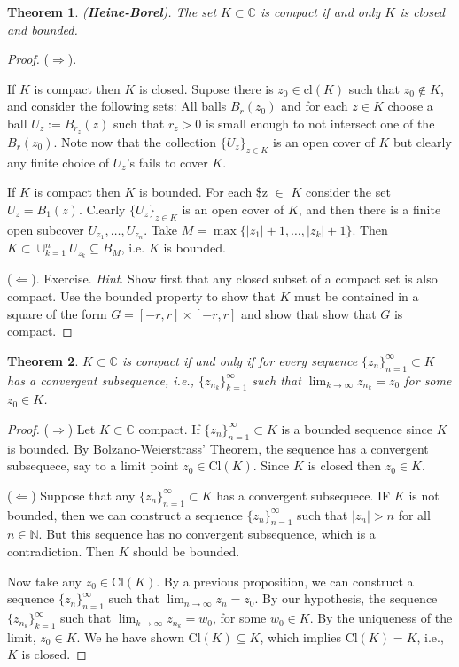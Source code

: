 \documentclass{amsart}
\newtheorem{thm}{Theorem}
\begin{document}
\begin{thm}
(\textbf{Heine-Borel}). The set \(K\subset \mathbb{C}\) is compact if and only \(K\) is closed and bounded.
\end{thm}
\begin{proof}


(\(\Rightarrow\)).

If \(K\) is compact then \(K\) is closed. Supose there is \(z_0\in \mbox{cl}(K)\) such that \(z_0\notin K\), and consider the following sets: All balls \(B_r(z_0)\) and for each \(z\in K\) choose a ball \(U_z:=B_{r_z}(z)\) such that \(r_z>0\) is small enough to not intersect one of the \(B_r(z_0)\). Note now that the collection \(\{U_z \}_{z\in K}\) is an open cover of \(K\) but clearly any finite choice of \(U_z\)'s fails to cover \(K\).

If \(K\) is compact then \(K\) is bounded. For each \$z \(\in\) \(K\) consider the set \(U_{z} = B_{1}(z)\). Clearly \(\{U_z \}_{z\in K}\) is an open cover of \(K\), and then there is a finite open subcover \(U_{z_1}, \ldots, U_{z_n}\). Take \(M = \max\{|z_1| + 1, \ldots, |z_k| +1 \}\). Then \(K \subset \cup_{k=1}^{n} U_{z_k} \subseteq B_M\), i.e. \(K\) is bounded.

(\(\Leftarrow\)). Exercise.
\emph{Hint}. Show first that any closed subset of a compact set is also compact. Use the bounded property to show that \(K\) must be contained in a square of the form \(G= [-r,r]\times [-r,r]\) and show that show that \(G\) is compact.
\end{proof}

\begin{thm}
\(K\subset \mathbb{C}\) is compact if and only if for every sequence \(\{z_n\}_{n=1}^{\infty}\subset K\) has a convergent subsequence, i.e., \(\{z_{n_k}\}_{k=1}^{\infty}\) such that \(\lim_{k\to\infty} z_{n_k} = z_0\) for some \(z_0\in K\).
\end{thm}
\begin{proof}
(\(\Rightarrow\)) Let \(K\subset\mathbb{C}\) compact. If \(\{z_n\}_{n=1}^{\infty}\subset K\) is a bounded sequence since \(K\) is bounded. By Bolzano-Weierstrass' Theorem, the sequence has a convergent subsequece, say to a limit point \(z_0\in \mbox{Cl}(K)\). Since \(K\) is closed then \(z_0\in K\).


(\(\Leftarrow\)) Suppose that any  \(\{z_n\}_{n=1}^{\infty}\subset K\)  has a convergent subsequece. IF \(K\) is not bounded, then we can construct a sequence \(\{z_n\}_{n=1}^{\infty}\) such that \(|z_n| > n\) for all \(n\in \mathbb{N}\). But this sequence has no convergent subsequence, which is a contradiction. Then \(K\) should be bounded.

Now take any \(z_0\in \mbox{Cl}(K)\). By a previous proposition, we can construct a sequence  \(\{z_{n}\}_{n=1}^{\infty}\) such that \(\lim_{n\to\infty} z_n = z_0\). By our hypothesis, the sequence \(\{z_{n_k}\}_{k=1}^{\infty}\) such that \(\lim_{k\to\infty} z_{n_k} = w_0\), for some \(w_0\in K\). By the uniqueness of the limit, \(z_0 \in K\). We he have shown \(\mbox{Cl}(K) \subseteq K\), which implies \(\mbox{Cl}(K) = K\), i.e., \(K\) is closed.
\end{proof}
\end{document}
